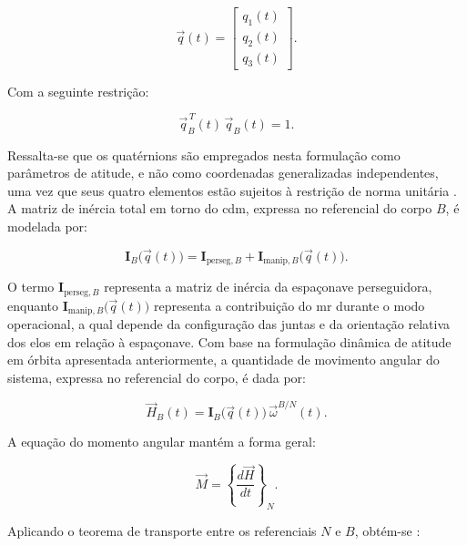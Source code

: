 \begin{equation}
\vec{q}(t)=
\begin{bmatrix}
q_1(t) \\
q_2(t) \\
q_3(t)
\end{bmatrix}.
\label{eq_vetor_juntas_mr}
\end{equation}

Com a seguinte restrição:

\begin{equation}
\vec{q}_B^{\,T}(t)\,\vec{q}_B(t)=1.
\label{eq_restricao_quaternion_unitario}
\end{equation}

Ressalta-se que os quatérnions são empregados nesta formulação como parâmetros de atitude, e não como coordenadas generalizadas independentes, uma vez que seus quatro elementos estão sujeitos à restrição de norma unitária \cite{wie2008space}.
A matriz de inércia total em torno do \gls{cdm}, expressa no referencial do corpo $B$, é modelada por:

\begin{equation}
\mathbf{I}_B\big(\vec{q}(t)\big)
=
\mathbf{I}_{\text{perseg},B}
+
\mathbf{I}_{\text{manip},B}\big(\vec{q}(t)\big).
\label{eq_inercia_total}
\end{equation}

O termo $\mathbf{I}_{\text{perseg},B}$ representa a matriz de inércia da espaçonave perseguidora, enquanto $\mathbf{I}_{\text{manip},B}\big(\vec{q}(t)\big)$ representa a contribuição do \gls{mr} durante o modo operacional, a qual depende da configuração das juntas e da orientação relativa dos elos em relação à espaçonave.
Com base na formulação dinâmica de atitude em órbita apresentada anteriormente, a quantidade de movimento angular do sistema, expressa no referencial do corpo, é dada por:

\begin{equation}
\vec{H}_B(t)
=
\mathbf{I}_B\big(\vec{q}(t)\big)\,
\vec{\omega}^{B/N}(t).
\label{eq_H_def}
\end{equation}

A equação do momento angular mantém a forma geral:

\begin{equation}
\vec{M}
=
\left\{ \frac{d\vec{H}}{dt} \right\}_{N}.
\label{eq_eq_momento_angular}
\end{equation}

Aplicando o teorema de transporte entre os referenciais $N$ e $B$, obtém-se \cite{wie2008space}:

